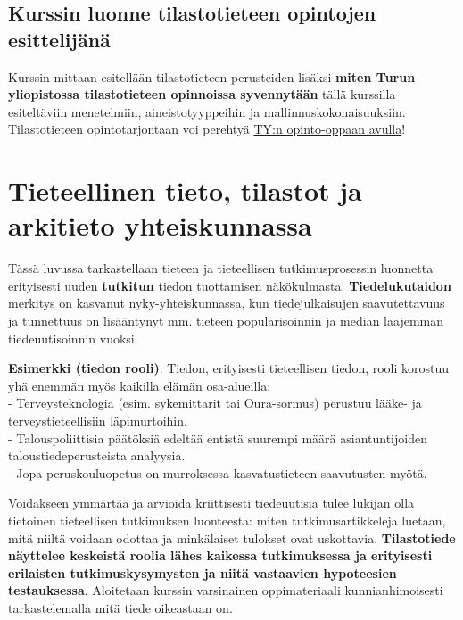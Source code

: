 \documentclass[
]{book}
\begin{document}
\hypertarget{kurssin-luonne-tilastotieteen-opintojen-esittelijuxe4nuxe4}{%
\section{Kurssin luonne tilastotieteen opintojen esittelijänä}\label{kurssin-luonne-tilastotieteen-opintojen-esittelijuxe4nuxe4}}

Kurssin mittaan esitellään tilastotieteen perusteiden lisäksi \textbf{miten Turun yliopistossa tilastotieteen opinnoissa syvennytään} tällä kurssilla esiteltäviin menetelmiin, aineistotyyppeihin ja mallinnuskokonaisuuksiin. Tilastotieteen opintotarjontaan voi perehtyä \href{https://opas.peppi.utu.fi/fi/ohjelma/89589}{TY:n opinto-oppaan avulla}!


\hypertarget{luku2}{%
\chapter{Tieteellinen tieto, tilastot ja arkitieto yhteiskunnassa}\label{luku2}}

Tässä luvussa tarkastellaan tieteen ja tieteellisen tutkimusprosessin luonnetta erityisesti uuden \textbf{tutkitun} tiedon tuottamisen näkökulmasta. \textbf{Tiedelukutaidon} merkitys on kasvanut nyky-yhteiskunnassa, kun tiedejulkaisujen saavutettavuus ja tunnettuus on lisääntynyt mm. tieteen popularisoinnin ja median laajemman tiedeuutisoinnin vuoksi.

\begin{eblock}{}
\textbf{Esimerkki (tiedon rooli)}: Tiedon, erityisesti tieteellisen tiedon, rooli korostuu yhä enemmän myös kaikilla elämän osa-alueilla:\\
- Terveysteknologia (esim. sykemittarit tai Oura-sormus) perustuu lääke- ja terveystieteellisiin läpimurtoihin.\\
- Talouspoliittisia päätöksiä edeltää entistä suurempi määrä asiantuntijoiden taloustiedeperusteista analyysia.\\
- Jopa peruskouluopetus on murroksessa kasvatustieteen saavutusten myötä.

\end{eblock}

Voidakseen ymmärtää ja arvioida kriittisesti tiedeuutisia tulee lukijan olla tietoinen tieteellisen tutkimuksen luonteesta: miten tutkimusartikkeleja luetaan, mitä niiltä voidaan odottaa ja minkälaiset tulokset ovat uskottavia. \textbf{Tilastotiede näyttelee keskeistä roolia lähes kaikessa tutkimuksessa ja erityisesti erilaisten tutkimuskysymysten ja niitä vastaavien hypoteesien testauksessa}. Aloitetaan kurssin varsinainen oppimateriaali kunnianhimoisesti tarkastelemalla mitä tiede oikeastaan on.
\end{document}
